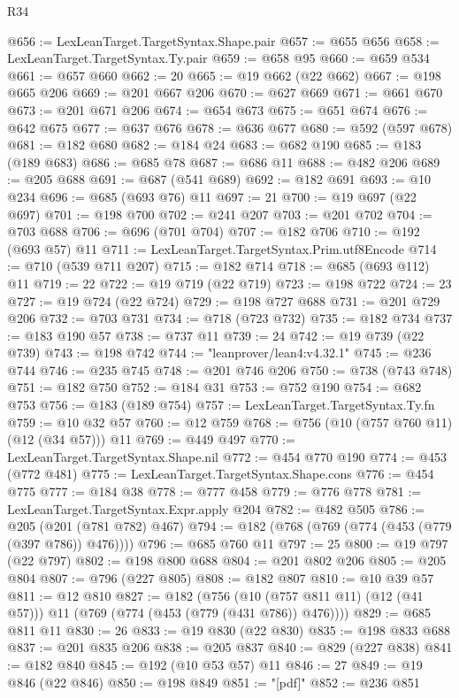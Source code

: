 \begin{lexlean}{R34}
\begin{coremodule}
@656 := LexLeanTarget.TargetSyntax.Shape.pair
@657 := @655 @656
@658 := LexLeanTarget.TargetSyntax.Ty.pair
@659 := @658 @95
@660 := @659 @534
@661 := @657 @660
@662 := 20
@665 := @19 @662 (@22 @662)
@667 := @198 @665 @206
@669 := @201 @667 @206
@670 := @627 @669
@671 := @661 @670
@673 := @201 @671 @206
@674 := @654 @673
@675 := @651 @674
@676 := @642 @675
@677 := @637 @676
@678 := @636 @677
@680 := @592 (@597 @678)
@681 := @182 @680
@682 := @184 @24
@683 := @682 @190
@685 := @183 (@189 @683)
@686 := @685 @78
@687 := @686 @11
@688 := @482 @206
@689 := @205 @688
@691 := @687 (@541 @689)
@692 := @182 @691
@693 := @10 @234
@696 := @685 (@693 @76) @11
@697 := 21
@700 := @19 @697 (@22 @697)
@701 := @198 @700
@702 := @241 @207
@703 := @201 @702
@704 := @703 @688
@706 := @696 (@701 @704)
@707 := @182 @706
@710 := @192 (@693 @57) @11
@711 := LexLeanTarget.TargetSyntax.Prim.utf8Encode
@714 := @710 (@539 @711 @207)
@715 := @182 @714
@718 := @685 (@693 @112) @11
@719 := 22
@722 := @19 @719 (@22 @719)
@723 := @198 @722
@724 := 23
@727 := @19 @724 (@22 @724)
@729 := @198 @727 @688
@731 := @201 @729 @206
@732 := @703 @731
@734 := @718 (@723 @732)
@735 := @182 @734
@737 := @183 @190 @57
@738 := @737 @11
@739 := 24
@742 := @19 @739 (@22 @739)
@743 := @198 @742
@744 := "leanprover/lean4:v4.32.1"
@745 := @236 @744
@746 := @235 @745
@748 := @201 @746 @206
@750 := @738 (@743 @748)
@751 := @182 @750
@752 := @184 @31
@753 := @752 @190
@754 := @682 @753
@756 := @183 (@189 @754)
@757 := LexLeanTarget.TargetSyntax.Ty.fn
@759 := @10 @32 @57
@760 := @12 @759
@768 := @756 (@10 (@757 @760 @11) (@12 (@34 @57))) @11
@769 := @449 @497
@770 := LexLeanTarget.TargetSyntax.Shape.nil
@772 := @454 @770 @190
@774 := @453 (@772 @481)
@775 := LexLeanTarget.TargetSyntax.Shape.cons
@776 := @454 @775
@777 := @184 @38
@778 := @777 @458
@779 := @776 @778
@781 := LexLeanTarget.TargetSyntax.Expr.apply @204
@782 := @482 @505
@786 := @205 (@201 (@781 @782) @467)
@794 := @182 (@768 (@769 (@774 (@453 (@779 (@397 @786)) @476))))
@796 := @685 @760 @11
@797 := 25
@800 := @19 @797 (@22 @797)
@802 := @198 @800 @688
@804 := @201 @802 @206
@805 := @205 @804
@807 := @796 (@227 @805)
@808 := @182 @807
@810 := @10 @39 @57
@811 := @12 @810
@827 := @182
    (@756 (@10 (@757 @811 @11) (@12 (@41 @57))) @11 (@769 (@774 (@453 (@779 (@431 @786)) @476))))
@829 := @685 @811 @11
@830 := 26
@833 := @19 @830 (@22 @830)
@835 := @198 @833 @688
@837 := @201 @835 @206
@838 := @205 @837
@840 := @829 (@227 @838)
@841 := @182 @840
@845 := @192 (@10 @53 @57) @11
@846 := 27
@849 := @19 @846 (@22 @846)
@850 := @198 @849
@851 := "[pdf]"
@852 := @236 @851

\end{coremodule}
\end{lexlean}
